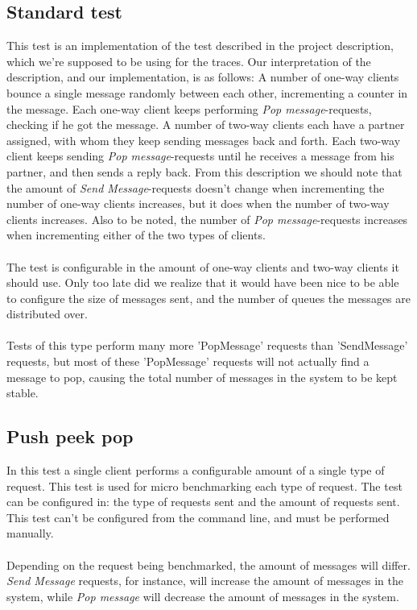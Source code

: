 \documentclass{article}
\begin{document}
        \subsection{Standard test}
            \label{sec:standard_test}
            This test is an implementation of the test described in the project description, which we're supposed to be using for the traces. Our interpretation of the description, and our implementation, is as follows: A number of one-way clients bounce a single message randomly between each other, incrementing a counter in the message. Each one-way client keeps performing \textit{Pop message}-requests, checking if he got the message. A number of two-way clients each have a partner assigned, with whom they keep sending messages back and forth. Each two-way client keeps sending \textit{Pop message}-requests until he receives a message from his partner, and then sends a reply back. From this description we should note that the amount of \textit{Send Message}-requests doesn't change when incrementing the number of one-way clients increases, but it does when the number of two-way clients increases. Also to be noted, the number of \textit{Pop message}-requests increases when incrementing either of the two types of clients.\\
            \\
            The test is configurable in the amount of one-way clients and two-way clients it should use. Only too late did we realize that it would have been nice to be able to configure the size of messages sent, and the number of queues the messages are distributed over.\\
            \\
            Tests of this type perform many more 'PopMessage' requests than 'SendMessage' requests, but most of these 'PopMessage' requests will not actually find a message to pop, causing the total number of messages in the system to be kept stable.

        \subsection{Push peek pop}
            In this test a single client performs a configurable amount of a single type of request. This test is used for micro benchmarking each type of request.
            The test can be configured in: the type of requests sent and the amount of requests sent. This test can't be configured from the command line, and must be performed manually.\\
            \\
            Depending on the request being benchmarked, the amount of messages will differ. \textit{Send Message} requests, for instance, will increase the amount of messages in the system, while \textit{Pop message} will decrease the amount of messages in the system.
\end{document}

